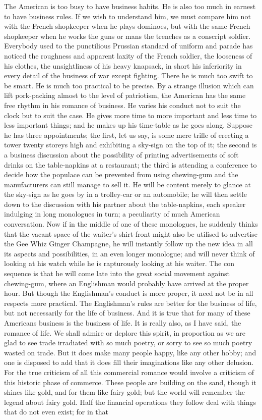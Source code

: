 \documentclass{book}
\begin{document}
The American is too busy to have business habits. He is also too much in earnest to have business rules. If we wish to understand him, we must compare him not with the French shopkeeper when he plays dominoes, but with the same French shopkeeper when he works the guns or mans the trenches as a conscript soldier. Everybody used to the punctilious Prussian standard of uniform and parade has noticed the roughness and apparent laxity of the French soldier, the looseness of his clothes, the unsightliness of his heavy knapsack, in short his inferiority in every detail of the business of war except fighting. There he is much too swift to be smart. He is much too practical to be precise. By a strange illusion which can lift pork-packing almost to the level of patriotism, the American has the same free rhythm in his romance of business. He varies his conduct not to suit the clock but to suit the case. He gives more time to more important and less time to less important things; and he makes up his time-table as he goes along. Suppose he has three appointments; the first, let us say, is some mere trifle of erecting a tower twenty storeys high and exhibiting a sky-sign on the top of it; the second is a business discussion about the possibility of printing advertisements of soft drinks on the table-napkins at a restaurant; the third is attending a conference to decide how the populace can be prevented from using chewing-gum and the manufacturers can still manage to sell it. He will be content merely to glance at the sky-sign as he goes by in a trolley-car or an automobile; he will then settle down to the discussion with his partner about the table-napkins, each speaker indulging in long monologues in turn; a peculiarity of much American conversation. Now if in the middle of one of these monologues, he suddenly thinks that the vacant space of the waiter’s shirt-front might also be utilised to advertise the Gee Whiz Ginger Champagne, he will instantly follow up the new idea in all its aspects and possibilities, in an even longer monologue; and will never think of looking at his watch while he is rapturously looking at his waiter. The con sequence is that he will come late into the great social movement against chewing-gum, where an Englishman would probably have arrived at the proper hour. But though the Englishman’s conduct is more proper, it need not be in all respects more practical. The Englishman’s rules are better for the business of life, but not necessarily for the life of business. And it is true that for many of these Americans business is the business of life. It is really also, as I have said, the romance of life. We shall admire or deplore this spirit, in proportion as we are glad to see trade irradiated with so much poetry, or sorry to see so much poetry wasted on trade. But it does make many people happy, like any other hobby; and one is disposed to add that it does fill their imaginations like any other delusion. For the true criticism of all this commercial romance would involve a criticism of this historic phase of commerce. These people are building on the sand, though it shines like gold, and for them like fairy gold; but the world will remember the legend about fairy gold. Half the financial operations they follow deal with things that do not even exist; for in that 
\end{document}
